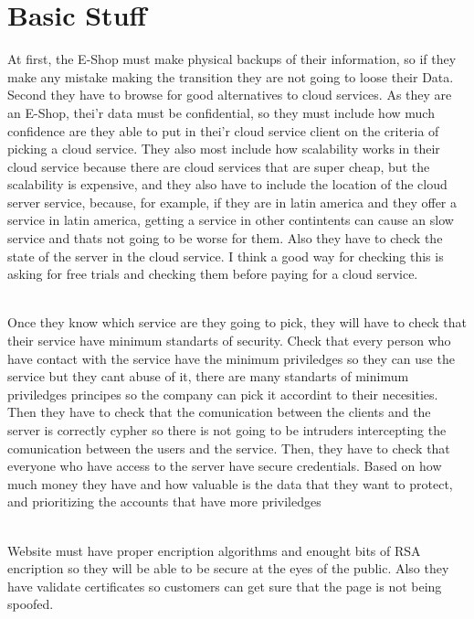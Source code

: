 \documentclass[10pt,a4paper]{article} %
\begin{document}
    \section{Basic Stuff}
        At first, the E-Shop must make physical backups of their information,
        so if they make any mistake making the transition they are not going to
        loose their Data. Second they have to browse for good alternatives to
        cloud services. As they are an E-Shop, thei'r data must be
        confidential, so they must include how much confidence are they able to
        put in thei'r cloud service client on the criteria of picking a cloud
        service. They also most include how scalability works in their cloud
        service because there are cloud services that are super cheap, but the
        scalability is expensive, and they also have to include the location of
        the cloud server service, because, for example, if they are in latin
        america and they offer a service in latin america, getting a service in
        other contintents can cause an slow service and thats not going to be
        worse for them. Also they have to check the state of the server in the
        cloud service. I think a good way for checking this is asking for free
        trials and checking them before paying for a cloud service. 

        \\Once they know which service are they going to pick, they will have to
        check that their service have minimum standarts of security. Check
        that every person who have contact with the service have the minimum
        priviledges so they can use the service but they cant abuse of it,
        there are many standarts of minimum priviledges principes so the
        company can pick it accordint to their necesities. Then
        they have to check that the comunication between the clients and the
        server is correctly cypher so there is not going to be intruders
        intercepting the comunication between the users and the service. Then,
        they have to check that everyone who have access to the server have
        secure credentials. Based on how much money they have and how valuable
        is the data that they want to protect, and prioritizing the accounts
        that have more priviledges 
        
        \\ Website must have proper encription algorithms and enought bits of
        RSA encription so they will be able to be secure at the eyes of the
        public. Also they have validate certificates so customers can get sure
        that the page is not being spoofed.
        
\end{document}
